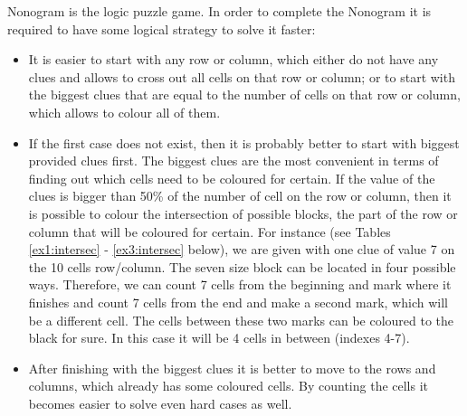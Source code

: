 Nonogram is the logic puzzle game. In order to complete the Nonogram it is required to have some logical strategy to solve it faster:
\begin{itemize}
	\item It is easier to start with any row or column, which either do not have any clues and allows to cross out all cells on that row or column; or to start with the biggest clues that are equal to the number of cells on that row or column, which allows to colour all of them.

	\item If the first case does not exist, then it is probably better to start with biggest provided clues first. The biggest clues are the most convenient in terms of finding out which cells need to be coloured for certain. If the value of the clues is bigger than 50\% of the number of cell on the row or column, then it is possible to colour the intersection of possible blocks, the part of the row or column that will be coloured for certain. 
	For instance (see Tables \ref{ex1:intersec} - \ref{ex3:intersec} below), we are given with one clue of value 7 on the 10 cells row/column. The seven size block can be located in four possible ways. Therefore, we can count 7 cells from the beginning and mark where it finishes and count 7 cells from the end and make a second mark, which will be a different cell. The cells between these two marks can be coloured to the black for sure. In this case it will be 4 cells in between (indexes 4-7).

	\item After finishing with the biggest clues it is better to move to the rows and columns, which already has some coloured cells. By counting the cells it becomes easier to solve even hard cases as well.
	
\end{itemize}





